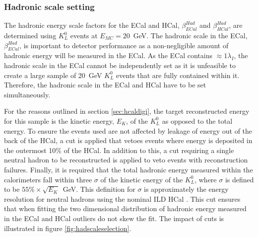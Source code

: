 
\subsubsection{Hadronic scale setting}
\label{sec:hadscalesetting}
The hadronic energy scale factors for the ECal and HCal, $\beta^{Had}_{ECal}$ and $\beta^{Had}_{HCal}$, are determined using $K^{0}_{L}$ events at $E_{MC} = 20$~GeV.  The hadronic scale in the ECal, $\beta^{Had}_{ECal}$, is important to detector performance as a non-negligible amount of hadronic energy will be measured in the ECal.  As the ECal contains $\approx 1 \lambda_{I}$, the hadronic scale in the ECal cannot be independently set as it is unfeasible to create a large sample of 20~GeV $K^{0}_{L}$ events that are fully contained within it.  Therefore, the hadronic scale in the ECal and HCal have to be set simultaneously.  

For the reasons outlined in section \ref{sec:hcaldigi}, the target reconstructed energy for this sample is the kinetic energy, $E_{K}$, of the $K^{0}_{L}$ as opposed to the total energy.  To ensure the events used are not affected by leakage of energy out of the back of the HCal, a cut is applied that vetoes events where energy is deposited in the outermost 10\% of the HCal.  In addition to this, a cut requiring a single neutral hadron to be reconstructed is applied to veto events with reconstruction failures.  Finally, it is required that the total hadronic energy measured within the calorimeters fall within three $\sigma$ of the kinetic energy of the $K^{0}_{L}$, where $\sigma$ is defined to be $55\% \times \sqrt{E_{K}}$~GeV.  This definition for $\sigma$ is approximately the energy resolution for neutral hadrons using the nominal ILD HCal \cite{Behnke:2013lya}.  This cut ensures that when fitting the two dimensional distribution of hadronic energy measured in the ECal and HCal outliers do not skew the fit.   The impact of cuts is illustrated in figure \ref{fig:hadscaleselection}.

